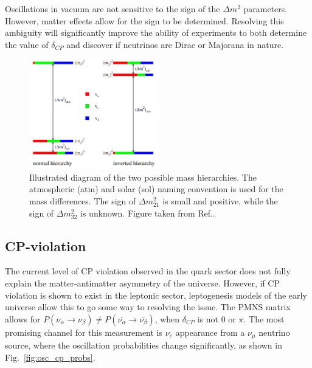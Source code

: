 Oscillations in vacuum are not sensitive to the sign of the $\Delta m^{2}$ parameters. However,
matter effects allow for the sign to be determined. Resolving this ambiguity will significantly
improve the ability of experiments to both determine the value of $\delta_{CP}$ and discover if
neutrinos are Dirac or Majorana in nature.

\begin{figure} %
    \includegraphics[origin=c,width=0.5\textwidth]{diagrams/3-theory/hierarchy.png}
    \caption[hierarchy short]
    {Illustrated diagram of the two possible mass hierarchies. The atmospheric (atm) and solar
        (sol) naming convention is used for the mass differences. The sign of
        $\Delta m_{21}^{2}$ is small and positive, while the sign of $\Delta m_{32}^{2}$ is
        unknown. Figure taken from Ref.\cite{gouvea2013}.}
    \label{fig:hierarchy}
\end{figure}

\subsection{CP-violation} %
\label{sec:theory_questions_cp} %

The current level of CP violation observed in the quark sector does not fully explain the
matter-antimatter asymmetry of the universe. However, if CP violation is shown to exist in the
leptonic sector, leptogenesis models of the early universe allow this to go some way to resolving
the issue. The PMNS matrix allows for
$P(\nu_{\alpha}\rightarrow\nu_{\beta}) \neq P(\bar{\nu_{\alpha}}\rightarrow\bar{\nu_{\beta}})$,
when $\delta_{CP}$ is not 0 or $\pi$. The most promising channel for this measurement is $\nu_{e}$
appearance from a $\nu_{\mu}$ neutrino source, where the oscillation probabilities change
significantly, as shown in Fig.~\ref{fig:osc_cp_probs}.

